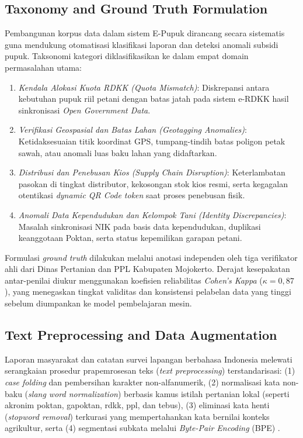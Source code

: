 \documentclass[conference]{IEEEtran}
\begin{document}
\subsection{Taxonomy and Ground Truth Formulation}
Pembangunan korpus data dalam sistem E-Pupuk dirancang secara sistematis guna mendukung otomatisasi klasifikasi laporan dan deteksi anomali subsidi pupuk. Taksonomi kategori diklasifikasikan ke dalam empat domain permasalahan utama:
\begin{enumerate}
    \item \textit{Kendala Alokasi Kuota RDKK (Quota Mismatch)}: Diskrepansi antara kebutuhan pupuk riil petani dengan batas jatah pada sistem e-RDKK hasil sinkronisasi \textit{Open Government Data}.
    \item \textit{Verifikasi Geospasial dan Batas Lahan (Geotagging Anomalies)}: Ketidaksesuaian titik koordinat GPS, tumpang-tindih batas poligon petak sawah, atau anomali luas baku lahan yang didaftarkan.
    \item \textit{Distribusi dan Penebusan Kios (Supply Chain Disruption)}: Keterlambatan pasokan di tingkat distributor, kekosongan stok kios resmi, serta kegagalan otentikasi \textit{dynamic QR Code token} saat proses penebusan fisik.
    \item \textit{Anomali Data Kependudukan dan Kelompok Tani (Identity Discrepancies)}: Masalah sinkronisasi NIK pada basis data kependudukan, duplikasi keanggotaan Poktan, serta status kepemilikan garapan petani.
\end{enumerate}
Formulasi \textit{ground truth} dilakukan melalui anotasi independen oleh tiga verifikator ahli dari Dinas Pertanian dan PPL Kabupaten Mojokerto. Derajat kesepakatan antar-penilai diukur menggunakan koefisien reliabilitas \textit{Cohen's Kappa} ($\kappa = 0{,}87$), yang menegaskan tingkat validitas dan konsistensi pelabelan data yang tinggi sebelum diumpankan ke model pembelajaran mesin.

\subsection{Text Preprocessing and Data Augmentation}
Laporan masyarakat dan catatan survei lapangan berbahasa Indonesia melewati serangkaian prosedur prapemrosesan teks (\textit{text preprocessing}) terstandarisasi: (1) \textit{case folding} dan pembersihan karakter non-alfanumerik, (2) normalisasi kata non-baku (\textit{slang word normalization}) berbasis kamus istilah pertanian lokal (seperti akronim poktan, gapoktan, rdkk, ppl, dan tebus), (3) eliminasi kata henti (\textit{stopword removal}) terkurasi yang mempertahankan kata bernilai konteks agrikultur, serta (4) segmentasi subkata melalui \textit{Byte-Pair Encoding} (BPE) \cite{b4}.
\end{document}
